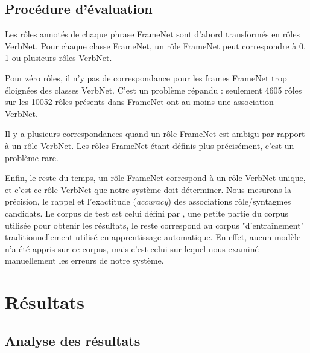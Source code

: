 \subsection{Procédure d'évaluation}

Les rôles annotés de chaque phrase FrameNet sont d'abord transformés en rôles
VerbNet. Pour chaque classe FrameNet, un rôle FrameNet peut correspondre à 0, 1
ou plusieurs rôles VerbNet.

Pour zéro rôles, il n'y pas de correspondance pour les frames FrameNet trop
éloignées des classes VerbNet. C'est un problème répandu : seulement 4605 rôles
sur les 10052 rôles présents dans FrameNet ont au moins une association
VerbNet.


Il y a plusieurs correspondances quand un rôle FrameNet est ambigu par rapport
à un rôle VerbNet. Les rôles FrameNet étant définis plus précisément, c'est un
problème rare.

Enfin, le reste du temps, un rôle FrameNet correspond à un rôle VerbNet unique,
et c'est ce rôle VerbNet que notre système doit déterminer. Nous mesurons la
précision, le rappel et l'exactitude (\textit{accuracy}) des associations
rôle/syntagmes candidats. Le corpus de test est celui défini par
\citep{das2011semi}, une petite partie du corpus utilisée pour obtenir les
résultats, le reste correspond au corpus "d'entraînement" traditionnellement
utilisé en apprentissage automatique. En effet, aucun modèle n'a été appris sur
ce corpus, mais c'est celui sur lequel nous examiné manuellement les erreurs de
notre système.

\section{Résultats}

\subsection{Analyse des résultats}
\label{resultats_srl}

